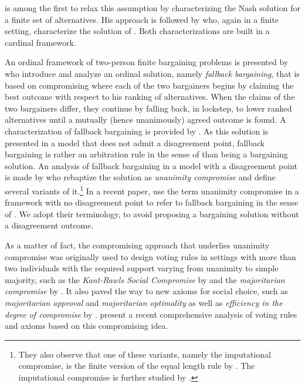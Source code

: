 \documentclass[pagesize, twoside=off, bibliography=totoc, DIV=calc, fontsize=12pt, a4paper]{scrartcl}
\begin{document}
 is among the first to relax this assumption by characterizing the Nash solution for a finite set of alternatives. His approach is followed by \citet{nagahisa2002axiomatization} who, again in a finite setting, characterize the solution of \citet{kalai1975other}. Both characterizations are built in a cardinal framework. 
 
An ordinal framework of two-person finite bargaining problems is presented by \citet{BramsKilgour2001} who introduce and analyze an ordinal solution, namely \textit{fallback bargaining}, that is based on compromising where each of the two bargainers begins by claiming the best outcome with respect to his ranking of alternatives. When the claims of the two bargainers differ, they continue by falling back, in lockstep, to lower ranked alternatives until a mutually (hence unanimously) agreed outcome is found. A characterization of fallback bargaining is provided by \citet{de2012reason}. As this solution is presented in a model that does not admit a disagreement point, fallback bargaining is rather an arbitration rule in the sense of \citet{Sprumont1993} than being a bargaining solution. An analysis of fallback bargaining in a model with a disagreement point is made by \citet{KibrisSertel2007} who rebaptize the solution as \textit{unanimity compromise} and define several variants of it.\footnote{They also observe that one of these variants, namely the imputational compromise, is the finite version of the equal length rule by \citet{thomson2019equal}. The imputational compromise is further studied by \citet{ConleyWilkie2012}.} In a recent paper, \citet{barbera2022compromising} use the term unanimity compromise in a framework with no disagreement point to refer to fallback bargaining in the sense of \citet{BramsKilgour2001}. We adopt their terminology, to avoid proposing a bargaining solution without a disagreement outcome.

As a matter of fact, the compromising approach that underlies unanimity compromise was originally used to design voting rules in settings with more than two individuals with the required support varying from unanimity to simple majority, such as the \textit{Kant-Rawls Social Compromise} by \citet{HurwiczSertel1997} and the \textit{majoritarian compromise} by \citet{sertel1999majoritarian}. It also paved the way to new axioms for social choice, such as \textit{majoritarian approval} and \textit{majoritarian optimality} as well as \textit{efficiency in the degree of compromise} by \citet{ozkal2004efficiency}.
\citet{merlin2019compromise} present a recent comprehensive analysis of voting rules and axioms based on this compromising idea.
\end{document}
